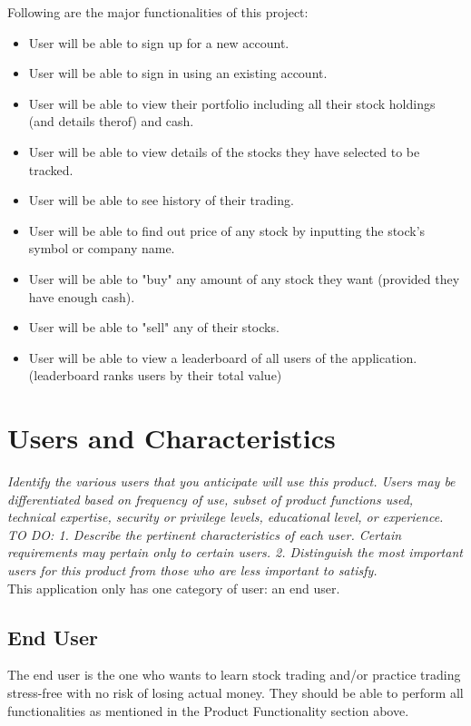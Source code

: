 \documentclass[12 pt, a4paper]{report}
\begin{document}
	Following are the major functionalities of this project:
	\begin{itemize}
		\item User will be able to sign up for a new account.
		\item User will be able to sign in using an existing account.
		\item User will be able to view their portfolio including all their stock holdings (and details therof) and cash.
		\item User will be able to view details of the stocks they have selected to be tracked.
		\item User will be able to see history of their trading.
		\item User will be able to find out price of any stock by inputting the stock's symbol or company name.
		\item User will be able to "buy" any amount of any stock they want (provided they have enough cash).
		\item User will be able to "sell" any of their stocks.
		\item User will be able to view a leaderboard of all users of the application. (leaderboard ranks users by their total value)
	\end{itemize}
	
	\section {Users and Characteristics}
	\textit{Identify the various users that you anticipate will use this product. Users may be differentiated based on frequency of use, subset of product functions used, technical expertise, security or privilege levels, educational level, or experience.}
	\textit{	TO DO: 
		1. Describe the pertinent characteristics of each user. Certain requirements may pertain only to certain users. 
		2. Distinguish the most important users for this product from those who are less important to satisfy.
	}\\
	This application only has one category of user: an end user.
	
	\subsection{End User}
	The end user is the one who wants to learn stock trading and/or practice trading stress-free with no risk of losing actual money. They should be able to perform all functionalities as mentioned in the Product Functionality section above.
	
\end{document}
